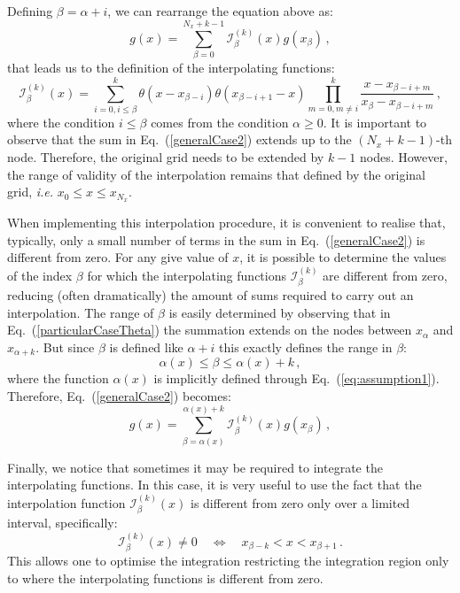 \documentclass[10pt,a4paper]{article}
\begin{document}
Defining $\beta=\alpha+i$, we can rearrange the equation above as:
\begin{equation}\label{generalCase2}
  g(x) =
  \sum_{\beta=0}^{N_x+k-1}\mathcal{I}_\beta^{(k)}(x) g(x_{\beta})\,,
\end{equation}
that leads us to the definition of the interpolating functions:
\begin{equation}\label{eq:intfunc}
  \mathcal{I}_\beta^{(k)}(x) = \sum_{i=0,i\leq\beta}^k
  \theta(x-x_{\beta-i})\theta(x_{\beta-i+1}-x) \prod^{k}_{m=0,m\ne
    i}\frac{x-x_{\beta-i+m}}{x_{\beta}-x_{\beta-i+m}}\,,
\end{equation}
where the condition $i\leq\beta$ comes from the condition
$\alpha\geq 0$. It is important to observe that the sum in
Eq.~(\ref{generalCase2}) extends up to the $(N_x+k-1)$-th
node. Therefore, the original grid needs to be extended by $k-1$
nodes. However, the range of validity of the interpolation remains
that defined by the original grid, \textit{i.e.}
$x_0 \leq x \leq x_{N_x}$. 

When implementing this interpolation procedure, it is convenient to
realise that, typically, only a small number of terms in the sum in
Eq.~(\ref{generalCase2}) is different from zero. For any give value of
$x$, it is possible to determine the values of the index $\beta$ for
which the interpolating functions $\mathcal{I}_\beta^{(k)}$ are
different from zero, reducing (often dramatically) the amount of sums
required to carry out an interpolation. The range of $\beta$ is easily
determined by observing that in Eq.~(\ref{particularCaseTheta}) the
summation extends on the nodes between $x_\alpha$ and
$x_{\alpha+k}$. But since $\beta$ is defined like $\alpha+i$ this
exactly defines the range in $\beta$:
\begin{equation}
\alpha(x) \leq \beta \leq \alpha(x) + k\,,
\end{equation}
where the function $\alpha(x)$ is implicitly defined through
Eq.~(\ref{eq:assumption1}). Therefore, Eq.~(\ref{generalCase2})
becomes:
\begin{equation}\label{eq:limitedsum}
  g(x) =
  \sum_{\beta=\alpha(x)}^{\alpha(x)+k}\mathcal{I}_\beta^{(k)}(x) g(x_{\beta})\,,
\end{equation}

Finally, we notice that sometimes it may be required to integrate the
interpolating functions. In this case, it is very useful to use the
fact that the interpolation function $\mathcal{I}_\beta^{(k)}(x)$ is
different from zero only over a limited interval, specifically:
\begin{equation}\label{eq:limits}
\mathcal{I}_\beta^{(k)}(x) \neq 0\quad \Leftrightarrow\quad
x_{\beta-k}<x < x_{\beta+1}\,.
\end{equation}
This allows one to optimise the integration restricting the
integration region only to where the interpolating functions is
different from zero.
\end{document}

